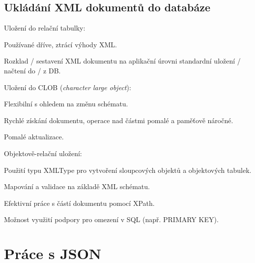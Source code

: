 \subsection{Ukládání XML dokumentů do databáze}

\begin{compactitem}
    \item Uložení do relační tabulky: \begin{compactitem}
        \item Používané dříve, ztrácí výhody XML.
        \item Rozklad / sestavení XML dokumentu na aplikační úrovni standardní uložení / načtení do / z DB.
    \end{compactitem}
    \item Uložení do CLOB (\textit{character large object}): \begin{compactitem}
        \item Flexibilní s ohledem na změnu schématu.
        \item Rychlé získání dokumentu, operace nad částmi pomalé a paměťově náročné.
        \item Pomalé aktualizace.
    \end{compactitem}
    \item Objektově-relační uložení: \begin{compactitem}
        \item Použití typu XMLType pro vytvoření sloupcových objektů a objektových tabulek.
        \item Mapování a validace na základě XML schématu.
        \item Efektivní práce s částí dokumentu pomocí XPath.
        \item Možnost využití podpory pro omezení v SQL (např. PRIMARY KEY).
    \end{compactitem}
\end{compactitem}


\section{Práce s JSON}

